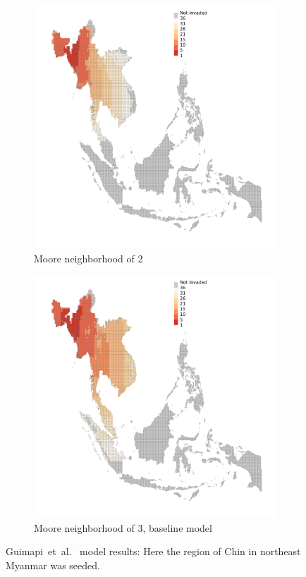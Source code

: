 \documentclass[10pt]{article}
\theoremstyle{definition}
\begin{document}
\begin{figure}[ht]
    \begin{subfigure}[b]{.48\textwidth}
\centering
\includegraphics[width=\textwidth]{figs/plot_Myanmar2.pdf}
\caption{Moore neighborhood of 2}
\end{subfigure}
\begin{subfigure}[b]{.48\textwidth}
\centering
\includegraphics[width=\textwidth]{figs/plot_Myanmar3.pdf}
\caption{Moore neighborhood of 3, baseline model}
\end{subfigure}
\caption{Guimapi~et~al.~\cite{guimapi2016modeling} model results: 
Here the region of Chin in northeast Myanmar was seeded.
    \label{fig:baselineMyanmar}}
\end{figure}
\end{document}
